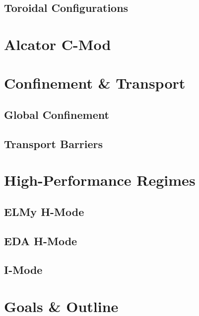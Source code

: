 \subsection{Toroidal Configurations}\label{subsec:intro_toroidal}


\section{Alcator C-Mod}\label{sec:intro_cmod}


\section{Confinement \& Transport}\label{sec:intro_confinement}

\subsection{Global Confinement}\label{subsec:intro_global}

\subsection{Transport Barriers}\label{subsec:intro_barriers}


\section{High-Performance Regimes}\label{sec:intro_regimes}

\subsection{ELMy H-Mode}\label{subsec:intro_elmy}

\subsection{EDA H-Mode}\label{subsec:intro_EDA}

\subsection{I-Mode}\label{subsec:intro_imode}


\section{Goals \& Outline}\label{sec:intro_outline}



%
% 
